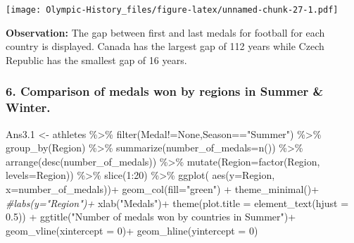 \documentclass[
]{article}
\newenvironment{Shaded}{\begin{snugshade}}{\end{snugshade}}
\newcommand{\AttributeTok}[1]{\textcolor[rgb]{0.77,0.63,0.00}{#1}}
\newcommand{\CommentTok}[1]{\textcolor[rgb]{0.56,0.35,0.01}{\textit{#1}}}
\newcommand{\DecValTok}[1]{\textcolor[rgb]{0.00,0.00,0.81}{#1}}
\newcommand{\FloatTok}[1]{\textcolor[rgb]{0.00,0.00,0.81}{#1}}
\newcommand{\FunctionTok}[1]{\textcolor[rgb]{0.00,0.00,0.00}{#1}}
\newcommand{\NormalTok}[1]{#1}
\newcommand{\OtherTok}[1]{\textcolor[rgb]{0.56,0.35,0.01}{#1}}
\newcommand{\SpecialCharTok}[1]{\textcolor[rgb]{0.00,0.00,0.00}{#1}}
\newcommand{\StringTok}[1]{\textcolor[rgb]{0.31,0.60,0.02}{#1}}
\begin{document}
\texttt{[image: Olympic-History\_files/figure-latex/unnamed-chunk-27-1.pdf]}

\textbf{Observation:} The gap between first and last medals for football
for each country is displayed. Canada has the largest gap of 112 years
while Czech Republic has the smallest gap of 16 years.

\hypertarget{comparison-of-medals-won-by-regions-in-summer-winter.}{%
\subsubsection{6. Comparison of medals won by regions in Summer \&
Winter.}\label{comparison-of-medals-won-by-regions-in-summer-winter.}}

\begin{Shaded}
\begin{Highlighting}[]
\NormalTok{Ans3}\FloatTok{.1} \OtherTok{\textless{}{-}}
\NormalTok{athletes }\SpecialCharTok{\%\textgreater{}\%}
\FunctionTok{filter}\NormalTok{(Medal}\SpecialCharTok{!=}\StringTok{\textquotesingle{}None\textquotesingle{}}\NormalTok{,Season}\SpecialCharTok{==}\StringTok{"Summer"}\NormalTok{) }\SpecialCharTok{\%\textgreater{}\%}
\FunctionTok{group\_by}\NormalTok{(Region) }\SpecialCharTok{\%\textgreater{}\%}
\FunctionTok{summarize}\NormalTok{(}\AttributeTok{number\_of\_medals=}\FunctionTok{n}\NormalTok{()) }\SpecialCharTok{\%\textgreater{}\%}
\FunctionTok{arrange}\NormalTok{(}\FunctionTok{desc}\NormalTok{(number\_of\_medals)) }\SpecialCharTok{\%\textgreater{}\%}
\FunctionTok{mutate}\NormalTok{(}\AttributeTok{Region=}\FunctionTok{factor}\NormalTok{(Region, }\AttributeTok{levels=}\NormalTok{Region)) }\SpecialCharTok{\%\textgreater{}\%}
\FunctionTok{slice}\NormalTok{(}\DecValTok{1}\SpecialCharTok{:}\DecValTok{20}\NormalTok{) }\SpecialCharTok{\%\textgreater{}\%}
\FunctionTok{ggplot}\NormalTok{( }\FunctionTok{aes}\NormalTok{(}\AttributeTok{y=}\NormalTok{Region, }\AttributeTok{x=}\NormalTok{number\_of\_medals))}\SpecialCharTok{+}
\FunctionTok{geom\_col}\NormalTok{(}\AttributeTok{fill=}\StringTok{"green"}\NormalTok{) }\SpecialCharTok{+}
\FunctionTok{theme\_minimal}\NormalTok{()}\SpecialCharTok{+}
\CommentTok{\#labs(y="Region")+}
\FunctionTok{xlab}\NormalTok{(}\StringTok{"Medals"}\NormalTok{)}\SpecialCharTok{+}
\FunctionTok{theme}\NormalTok{(}\AttributeTok{plot.title =} \FunctionTok{element\_text}\NormalTok{(}\AttributeTok{hjust =} \FloatTok{0.5}\NormalTok{)) }\SpecialCharTok{+}
\FunctionTok{ggtitle}\NormalTok{(}\StringTok{"Number of medals won by countries in Summer"}\NormalTok{)}\SpecialCharTok{+}
\FunctionTok{geom\_vline}\NormalTok{(}\AttributeTok{xintercept =} \DecValTok{0}\NormalTok{)}\SpecialCharTok{+}
\FunctionTok{geom\_hline}\NormalTok{(}\AttributeTok{yintercept =} \DecValTok{0}\NormalTok{)}


\end{Highlighting}
\end{Shaded}
\end{document}
